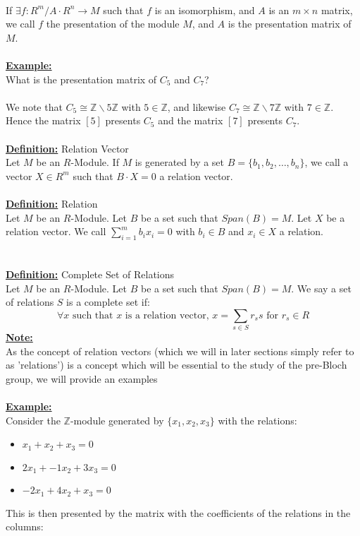 \documentclass[11pt]{article}
\theoremstyle{plain}
\theoremstyle{definition}
\begin{document}
\\
If  $\exists f: R^m / A\cdot R^n \rightarrow M$ such that $f$ is an isomorphism, and $A$ is an $m \times n$ matrix, we call $f$ the presentation of the module $M$, and $A$ is the presentation matrix of $M$.\\
\\
\textbf{\underline{Example:}}\\
What is the presentation matrix of $C_5$ and $C_7$?\\
\\
We note that $C_5 \cong \mathbb{Z} \backslash5\mathbb{Z}$ with $5 \in \mathbb{Z}$, and likewise $C_7 \cong \mathbb{Z} \backslash7\mathbb{Z}$ with $7 \in \mathbb{Z}$. Hence the matrix $[5]$ presents $C_5$ and the matrix $[7]$ presents $C_7$. \\
\\
\textbf{\underline{Definition:}} Relation Vector\\
Let $M$ be an $R$-Module. If $M$ is generated by a set $B=\{b_1, b_2, \ldots, b_n\}$, we call a vector $X \in R^m$ such that $B\cdot X = 0$ a relation vector. \\
\\
\textbf{\underline{Definition:}} Relation\\
Let $M$ be an $R$-Module. Let $B$ be a set such that $Span(B)=M$. Let $X$ be a relation vector. We call $\sum_{i=1}^{m} b_i x_i = 0$ with $b_i \in B$ and $x_i \in X$ a relation.\\
\\
\\
\textbf{\underline{Definition:}} Complete Set of Relations\\
Let $M$ be an $R$-Module. Let $B$ be a set such that $Span(B)=M$. We say a set of relations $S$ is a complete set if:
\begin{equation*} \forall x\text{ such that }x\text{ is a relation vector, }x = \sum_{s \in S} r_s s\text{ for }r_s \in R
\end{equation*}
\textbf{\underline{Note:}}\\As the concept of relation vectors (which we will in later sections simply refer to as 'relations') is a concept which will be essential to the study of the pre-Bloch group, we will provide an examples\\
\\
\textbf{\underline{Example:}} \\
Consider the $\mathbb{Z}$-module generated by $\{x_1, x_2, x_3\}$ with the relations:

\begin{itemize}
	\item $x_1 + x_2 + x_3=0$
	\item $2 x_1 + -1 x_2 + 3 x_3 = 0$
	\item $-2 x_1 +4 x_2 + x_3=0$
\end{itemize}
This is then presented by the matrix with the coefficients of the relations in the columns:
\end{document}
